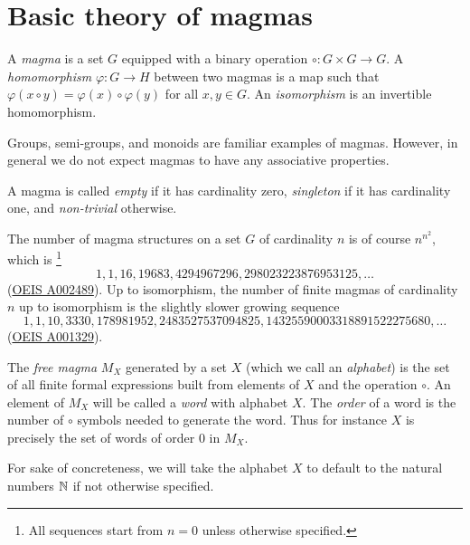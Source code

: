 \chapter{Basic theory of magmas}

\begin{definition}[Magma]\label{magma-def}\leanok A \emph{magma} is a set $G$ equipped with a binary operation $\circ: G \times G \to G$.  A \emph{homomorphism} $\varphi : G \to H$ between two magmas is a map such that $\varphi(x \circ y) = \varphi(x) \circ \varphi(y)$ for all $x,y \in G$.  An \emph{isomorphism} is an invertible homomorphism.
\end{definition}

Groups, semi-groups, and monoids are familiar examples of magmas.  However, in general we do not expect magmas to have any associative properties.

A magma is called \emph{empty} if it has cardinality zero, \emph{singleton} if it has cardinality one, and \emph{non-trivial} otherwise.

The number of magma structures on a set $G$ of cardinality $n$ is of course $n^{n^2}$, which is \footnote{All sequences start from $n=0$ unless otherwise specified.}
$$ 1, 1, 16, 19683, 4294967296, 298023223876953125, \dots$$
(\href{https://oeis.org/A002489}{OEIS A002489}).
Up to isomorphism, the number of finite magmas of cardinality $n$ up to isomorphism is the slightly slower growing sequence
$$ 1, 1, 10, 3330, 178981952, 2483527537094825, 14325590003318891522275680, \dots$$
(\href{https://oeis.org/A001329}{OEIS A001329}).

\begin{definition}\label{free-magma-def}\leanok{} The \emph{free magma} $M_X$ generated by a set $X$ (which we call an \emph{alphabet}) is the set of all finite formal expressions built from elements of $X$ and the operation $\circ$.  An element of $M_X$ will be called a \emph{word} with alphabet $X$.  The \emph{order} of a word is the number of $\circ$ symbols needed to generate the word.  Thus for instance $X$ is precisely the set of words of order $0$ in $M_X$.
\end{definition}

For sake of concreteness, we will take the alphabet $X$ to default to the natural numbers $\mathbb{N}$ if not otherwise specified.

